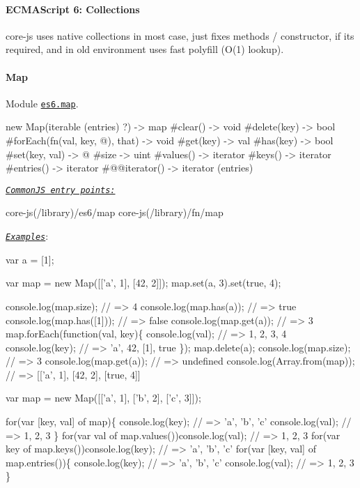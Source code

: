 \paragraph*{E\+C\+M\+A\+Script 6\+: Collections}

{\ttfamily core-\/js} uses native collections in most case, just fixes methods / constructor, if it\textquotesingle{}s required, and in old environment uses fast polyfill (O(1) lookup). \paragraph*{Map}

Module \href{https://github.com/zloirock/core-js/blob/v2.6.0/modules/es6.map.js}{\tt {\ttfamily es6.\+map}}. 
\begin{DoxyCode}
new Map(iterable (entries) ?)     -> map
  #clear()                        -> void
  #delete(key)                    -> bool
  #forEach(fn(val, key, @), that) -> void
  #get(key)                       -> val
  #has(key)                       -> bool
  #set(key, val)                  -> @
  #size                           -> uint
  #values()                       -> iterator
  #keys()                         -> iterator
  #entries()                      -> iterator
  #@@iterator()                   -> iterator (entries)
\end{DoxyCode}
 \href{#commonjs}{\tt {\itshape Common\+JS entry points\+:}} 
\begin{DoxyCode}
core-js(/library)/es6/map
core-js(/library)/fn/map
\end{DoxyCode}
 \href{http://goo.gl/GWR7NI}{\tt {\itshape Examples}}\+: 
\begin{DoxyCode}
var a = [1];

var map = new Map([['a', 1], [42, 2]]);
map.set(a, 3).set(true, 4);

console.log(map.size);        // => 4
console.log(map.has(a));      // => true
console.log(map.has([1]));    // => false
console.log(map.get(a));      // => 3
map.forEach(function(val, key)\{
  console.log(val);           // => 1, 2, 3, 4
  console.log(key);           // => 'a', 42, [1], true
\});
map.delete(a);
console.log(map.size);        // => 3
console.log(map.get(a));      // => undefined
console.log(Array.from(map)); // => [['a', 1], [42, 2], [true, 4]]

var map = new Map([['a', 1], ['b', 2], ['c', 3]]);

for(var [key, val] of map)\{
  console.log(key);                           // => 'a', 'b', 'c'
  console.log(val);                           // => 1, 2, 3
\}
for(var val of map.values())console.log(val); // => 1, 2, 3
for(var key of map.keys())console.log(key);   // => 'a', 'b', 'c'
for(var [key, val] of map.entries())\{
  console.log(key);                           // => 'a', 'b', 'c'
  console.log(val);                           // => 1, 2, 3
\}
\end{DoxyCode}
